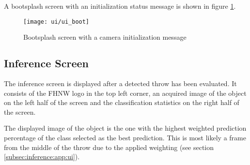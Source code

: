 A bootsplash screen with an initialization status message is shown in figure \ref{fig:ui_boot}.

\begin{figure}
  \centering
  \texttt{[image: ui/ui\_boot]}
  \caption{Bootsplash screen with a camera initialization message}
  \label{fig:ui_boot}
\end{figure}

\subsection{Inference Screen}
\label{subsec:inference:user_interface:inference_screen}

The inference screen is displayed after a detected throw has been evaluated.
It consists of the FHNW logo in the top left corner, an acquired image of the object on the left half of the screen and the classification statistics on the right half of the screen.

The displayed image of the object is the one with the highest weighted prediction percentage of the class selected as the best prediction.
This is most likely a frame from the middle of the throw due to the applied weighting (see section \ref{subsec:inference:app:ui}).

